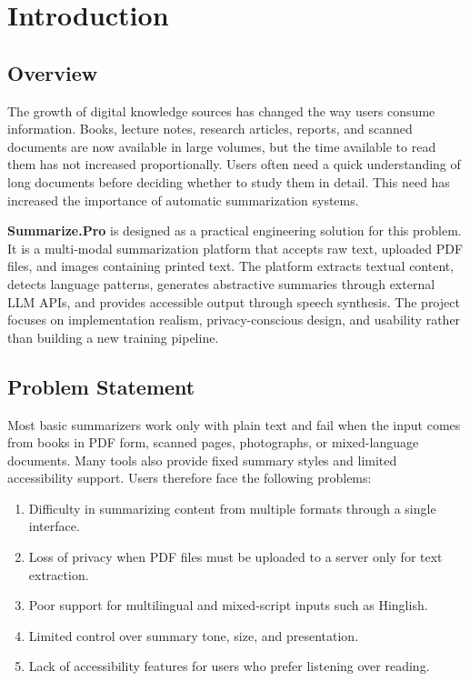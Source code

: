 \documentclass[12pt, a4paper]{report}
\begin{document}
\clearpage
{}

\chapter{Introduction}
\section{Overview}
The growth of digital knowledge sources has changed the way users consume information. Books, lecture notes, research articles, reports, and scanned documents are now available in large volumes, but the time available to read them has not increased proportionally. Users often need a quick understanding of long documents before deciding whether to study them in detail. This need has increased the importance of automatic summarization systems.

\textbf{Summarize.Pro} is designed as a practical engineering solution for this problem. It is a multi-modal summarization platform that accepts raw text, uploaded PDF files, and images containing printed text. The platform extracts textual content, detects language patterns, generates abstractive summaries through external LLM APIs, and provides accessible output through speech synthesis. The project focuses on implementation realism, privacy-conscious design, and usability rather than building a new training pipeline.

\section{Problem Statement}
Most basic summarizers work only with plain text and fail when the input comes from books in PDF form, scanned pages, photographs, or mixed-language documents. Many tools also provide fixed summary styles and limited accessibility support. Users therefore face the following problems:
\begin{enumerate}[label=\arabic*.]
  \item Difficulty in summarizing content from multiple formats through a single interface.
  \item Loss of privacy when PDF files must be uploaded to a server only for text extraction.
  \item Poor support for multilingual and mixed-script inputs such as Hinglish.
  \item Limited control over summary tone, size, and presentation.
  \item Lack of accessibility features for users who prefer listening over reading.
\end{enumerate}
\end{document}

